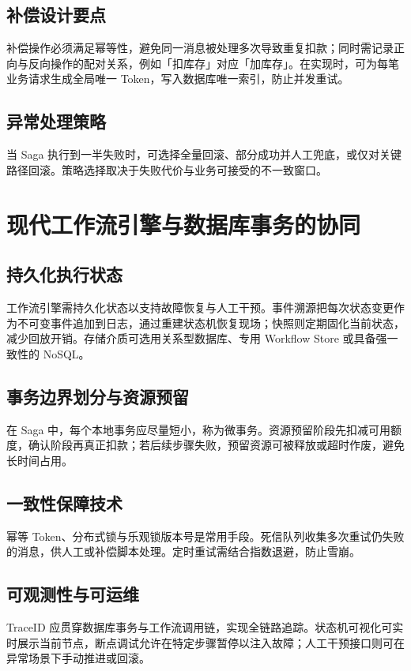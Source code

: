 \section{补偿设计要点}
补偿操作必须满足幂等性，避免同一消息被处理多次导致重复扣款；同时需记录正向与反向操作的配对关系，例如「扣库存」对应「加库存」。在实现时，可为每笔业务请求生成全局唯一 Token，写入数据库唯一索引，防止并发重试。\par
\section{异常处理策略}
当 Saga 执行到一半失败时，可选择全量回滚、部分成功并人工兜底，或仅对关键路径回滚。策略选择取决于失败代价与业务可接受的不一致窗口。\par
\chapter{现代工作流引擎与数据库事务的协同}
\section{持久化执行状态}
工作流引擎需持久化状态以支持故障恢复与人工干预。事件溯源把每次状态变更作为不可变事件追加到日志，通过重建状态机恢复现场；快照则定期固化当前状态，减少回放开销。存储介质可选用关系型数据库、专用 Workflow Store 或具备强一致性的 NoSQL。\par
\section{事务边界划分与资源预留}
在 Saga 中，每个本地事务应尽量短小，称为微事务。资源预留阶段先扣减可用额度，确认阶段再真正扣款；若后续步骤失败，预留资源可被释放或超时作废，避免长时间占用。\par
\section{一致性保障技术}
幂等 Token、分布式锁与乐观锁版本号是常用手段。死信队列收集多次重试仍失败的消息，供人工或补偿脚本处理。定时重试需结合指数退避，防止雪崩。\par
\section{可观测性与可运维}
TraceID 应贯穿数据库事务与工作流调用链，实现全链路追踪。状态机可视化可实时展示当前节点，断点调试允许在特定步骤暂停以注入故障；人工干预接口则可在异常场景下手动推进或回滚。\par
